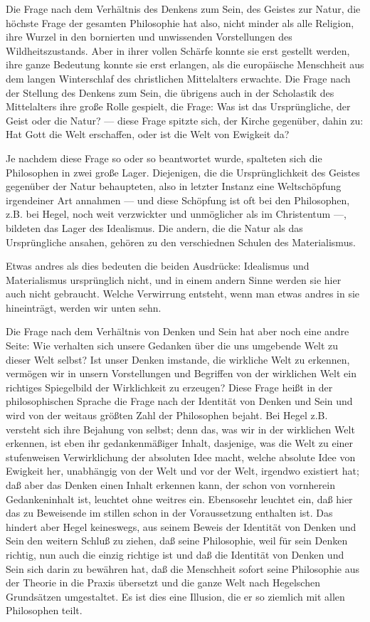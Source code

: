 Die Frage nach dem Verhältnis des Denkens zum Sein, des Geistes
zur Natur, die höchste Frage der gesamten Philosophie hat also, nicht
minder als alle Religion, ihre Wurzel in den bornierten und unwissenden
Vorstellungen des Wildheitszustands. Aber in ihrer vollen Schärfe konnte
sie erst gestellt werden, ihre ganze Bedeutung konnte sie erst erlangen,
als die europäische Menschheit aus dem langen Winterschlaf des
christlichen Mittelalters erwachte. Die Frage nach der Stellung des
Denkens zum Sein, die übrigens auch in der Scholastik des Mittelalters
ihre große Rolle gespielt, die Frage: Was ist das Ursprüngliche, der
Geist oder die Natur? --- diese Frage spitzte sich, der Kirche gegenüber,
dahin zu: Hat Gott die Welt erschaffen, oder ist die Welt von Ewigkeit
da?

Je nachdem diese Frage so oder so beantwortet wurde, spalteten
sich die Philosophen in zwei große Lager. Diejenigen, die die
Ursprünglichkeit des Geistes gegenüber der Natur behaupteten, also in
letzter Instanz eine Weltschöpfung irgendeiner Art annahmen --- und diese
Schöpfung ist oft bei den Philosophen, z.B. bei Hegel, noch weit
verzwickter und unmöglicher als im Christentum ---, bildeten das Lager des
Idealismus. Die andern, die die Natur als das Ursprüngliche ansahen,
gehören zu den verschiednen Schulen des Materialismus.

Etwas andres als dies bedeuten die beiden Ausdrücke: Idealismus
und Materialismus ursprünglich nicht, und in einem andern Sinne werden
sie hier auch nicht gebraucht. Welche Verwirrung entsteht, wenn man
etwas andres in sie hineinträgt, werden wir unten sehn.

Die Frage nach dem Verhältnis von Denken und Sein hat aber noch
eine andre Seite: Wie verhalten sich unsere Gedanken über die uns
umgebende Welt zu dieser Welt selbst? Ist unser Denken imstande, die
wirkliche Welt zu erkennen, vermögen wir in unsern Vorstellungen und
Begriffen von der wirklichen Welt ein richtiges Spiegelbild der
Wirklichkeit zu erzeugen? Diese Frage heißt in der philosophischen
Sprache die Frage nach der Identität von Denken und Sein und wird von
der weitaus größten Zahl der Philosophen bejaht. Bei Hegel z.B. versteht
sich ihre Bejahung von selbst; denn das, was wir in der wirklichen Welt
erkennen, ist eben ihr gedankenmäßiger Inhalt, dasjenige, was die Welt
zu einer stufenweisen Verwirklichung der absoluten Idee macht, welche
absolute Idee von Ewigkeit her, unabhängig von der Welt und vor der
Welt, irgendwo existiert hat; daß aber das Denken einen Inhalt erkennen
kann, der schon von vornherein Gedankeninhalt ist, leuchtet ohne weitres
ein. Ebensosehr leuchtet ein, daß hier das zu Beweisende im stillen
schon in der Voraussetzung enthalten ist. Das hindert aber Hegel
keineswegs, aus seinem Beweis der Identität von Denken und Sein den
weitern Schluß zu ziehen, daß seine Philosophie, weil für sein Denken
richtig, nun auch die einzig richtige ist und daß die Identität von
Denken und Sein sich darin zu bewähren hat, daß die Menschheit sofort
seine Philosophie aus der Theorie in die Praxis übersetzt und die ganze
Welt nach Hegelschen Grundsätzen umgestaltet. Es ist dies eine Illusion,
die er so ziemlich mit allen Philosophen teilt.

